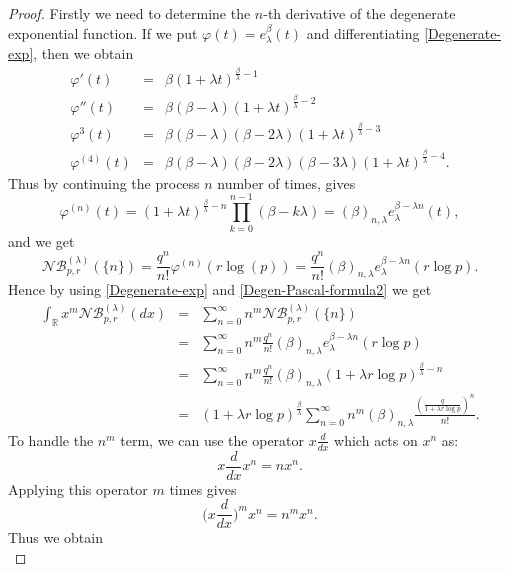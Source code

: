 \documentclass{birkjour}
\theoremstyle{definition}
\theoremstyle{remark}
\numberwithin{equation}{section}
\begin{document}
\begin{proof}
Firstly we need to determine the $n$-th derivative of the degenerate
exponential function. If we put $\varphi(t)=e^{\beta}_{\lambda}(t)$
and differentiating \eqref{Degenerate-exp}, then we obtain
$$\begin{array}{lll}
\varphi'(t)&=&\beta(1+\lambda t)^{\frac{\beta}{\lambda}-1}\\
\varphi''(t)&=&\beta(\beta-\lambda)(1+\lambda t)^{\frac{\beta}{\lambda}-2}\\
\varphi^{3}(t)&=&\beta(\beta-\lambda)(\beta-2\lambda)(1+\lambda t)^{\frac{\beta}{\lambda}-3}\\
\varphi^{(4)}(t)&=&\beta(\beta-\lambda)(\beta-2\lambda)(\beta-3\lambda)(1+\lambda
t)^{\frac{\beta}{\lambda}-4}.
\end{array}$$
Thus by continuing the process $n$ number of times, gives
$$\varphi^{(n)}(t)=\displaystyle{(1+\lambda t)^{\frac{\beta}{\lambda}-n}\prod^{n-1}_{k=0}(\beta-k\lambda)
=(\beta)_{n, \lambda}e^{\beta-\lambda n}_{\lambda}(t)},$$ and we get
\begin{equation}\label{Degen-Pascal-formula2}
\mathcal{N}\mathcal{B}^{(\lambda)}_{p,
r}(\{n\})=\displaystyle{\frac{q^{n}}{n!}\varphi^{(n)}(r\log(p))
=\frac{q^{n}}{n!}(\beta)_{n, \lambda}e^{\beta-\lambda
n}_{\lambda}(r\log p)}.
\end{equation}
Hence by using \eqref{Degenerate-exp} and
\eqref{Degen-Pascal-formula2} we get
\begin{eqnarray}\label{moments-F1}
\displaystyle{\int_{\mathbb{R}}x^{m}\mathcal{N}\mathcal{B}^{(\lambda)}_{p,
r}(dx)}&=&\displaystyle{\sum^{\infty}_{n=0}n^{m}\mathcal{N}\mathcal{B}^{(\lambda)}_{p, r}(\{n\})}\nonumber\\
&=&\displaystyle{\sum^{\infty}_{n=0}n^{m}\frac{q^{n}}{n!}(\beta)_{n,
\lambda}e^{\beta-\lambda n}_{\lambda}(r\log p)}\nonumber\\
&=&\displaystyle{\sum^{\infty}_{n=0}n^{m}\frac{q^{n}}{n!}(\beta)_{n,
\lambda}(1+\lambda r\log p)^{\frac{\beta}{\lambda}-n}}\nonumber\\
&=&\displaystyle{(1+\lambda r\log
p)^{\frac{\beta}{\lambda}}\sum^{\infty}_{n=0}n^{m}(\beta)_{n,
\lambda}\frac{(\frac{q}{1+\lambda r\log p})^{n}}{n!}}.
\end{eqnarray}
To handle the $n^{m}$ term, we can use the operator
$\displaystyle{x\frac{d}{dx}}$ which acts on $x^{n}$ as:
$$\displaystyle{x\frac{d}{dx}x^{n}=nx^{n}}.$$
Applying this operator $m$ times gives
$$\displaystyle{\Big(x\frac{d}{dx}\Big)^{m}x^{n}=n^{m}x^{n}}.$$
Thus we obtain
\begin{equation}\label{moments-F2}

\end{equation}
\end{proof}
\end{document}

